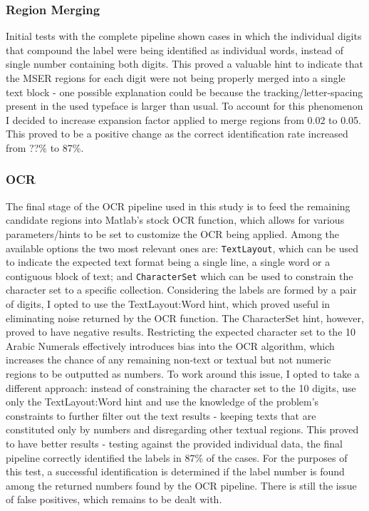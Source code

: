 \documentclass[11pt]{article}
\begin{document}
    \subsubsection{Region Merging}
        Initial tests with the complete pipeline shown cases in which the individual digits that compound the label were being identified as individual words, instead of single number containing both digits. This proved a valuable hint to indicate that the MSER regions for each digit were not being properly merged into a single text block - one possible explanation could be because the tracking/letter-spacing present in the used typeface is larger than usual. To account for this phenomenon I decided to increase expansion factor applied to merge regions from 0.02 to 0.05. This proved to be a positive change as the correct identification rate increased from ??\% to 87\%.

    \subsubsection{OCR}
        The final stage of the OCR pipeline used in this study is to feed the remaining candidate regions into Matlab's stock OCR function, which allows for various parameters/hints to be set to customize the OCR being applied. Among the available options the two most relevant ones are: \texttt{TextLayout}, which can be used to indicate the expected text format being a single line, a single word or a contiguous block of text; and \texttt{CharacterSet} which can be used to constrain the character set to a specific collection. Considering the labels are formed by a pair of digits, I opted to use the TextLayout:Word hint, which proved useful in eliminating noise returned by the OCR function. The CharacterSet hint, however, proved to have negative results. Restricting the expected character set to the 10 Arabic Numerals effectively introduces bias into the OCR algorithm, which increases the chance of any remaining non-text or textual but not numeric regions to be outputted as numbers. To work around this issue, I opted to take a different approach: instead of constraining the character set to the 10 digits, use only the TextLayout:Word hint and use the knowledge of the problem's constraints to further filter out the text results - keeping texts that are constituted only by numbers and disregarding other textual regions. This proved to have better results - testing against the provided individual data, the final pipeline correctly identified the labels in 87\% of the cases. For the purposes of this test, a successful identification is determined if the label number is found among the returned numbers found by the OCR pipeline. There is still the issue of false positives, which remains to be dealt with.
\end{document}
